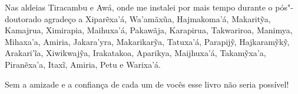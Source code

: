 Nas aldeias Tiracambu e Awá, onde me instalei por mais tempo durante o
pós"-doutorado agradeço a Xiparẽxa'á, Wa'amãxũa, Hajmakoma'á, Makaritỹa,
Kamajrua, Ximirapia, Maihuxa'á, Pakawãja, Karapirua, Takwariroa,
Manimya, Mihaxa'a, Amiria, Jakara'yra, Makarikarỹa, Tatuxa'á, Parapijỹ,
Hajkaramỹkỹ, Arakari'ĩa, Xiwikwajỹa, Irakatakoa, Aparikya, Maijhuxa'á,
Takamỹxa'a, Piranẽxa'a, Itaxĩ, Amiria, Petu e Warixa'á.

Sem a amizade e a confiança de cada um de vocês esse livro não seria
possível!

